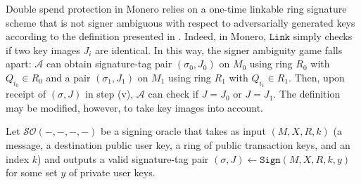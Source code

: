 \documentclass{mrl}
\theoremstyle{definition}
\begin{document}
Double spend protection in Monero relies on a one-time linkable ring signature scheme that is not signer ambiguous with respect to adversarially generated keys according to the definition presented in \cite{bender2006ring}. Indeed, in Monero, $\texttt{Link}$ simply checks if two key images $J_i$ are identical. In this way, the signer ambiguity game falls apart: $\mathcal{A}$ can obtain signature-tag pair $(\sigma_0, J_0)$ on $M_0$ using ring $R_0$ with $Q_{i_0} \in R_0$ and a pair $(\sigma_1, J_1)$ on $M_1$ using ring $R_1$ with $Q_{i_1} \in R_1$. Then, upon receipt of $(\sigma,J)$ in step (v), $\mathcal{A}$ can check if $J=J_0$ or $J=J_1$. The definition may be modified, however, to take key images into account.


Let $\mathcal{SO}(-,-,-,-)$ be a signing oracle that takes as input $(M,X,R,k)$ (a message, a destination public user key, a ring of public transaction keys, and an index $k$) and outputs a valid signature-tag pair $(\sigma, J) \leftarrow \texttt{Sign}(M,X,R,k,y)$ for some set $y$ of private user keys.
\end{document}
